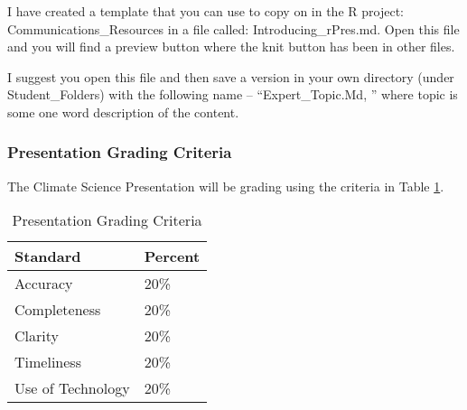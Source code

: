 I have created a template that you can use to copy on in the R project: Communications\_Resources in a file called: Introducing\_rPres.md. Open this file and you will find a preview button where the knit button has been in other files. 

I suggest you open this file and then save a version in your own directory (under Student\_Folders) with the following name -- ``Expert\_Topic.Md, '' where topic is some one word description of the content.

\subsubsection{Presentation Grading Criteria}

The Climate Science Presentation will be grading using the criteria in Table \ref{tab:presentationgrading}.

\begin{table}[h]
\centering
\caption{Presentation Grading Criteria}
\label{tab:presentationgrading}
\begin{tabular}{ll}\hline
Standard            & Percent \\ \hline\hline    
Accuracy            & 20\%  \\
Completeness        & 20\% \\
Clarity             & 20\% \\
Timeliness          & 20\% \\
Use of Technology   & 20\% \\ \hline
\end{tabular}
\end{table}